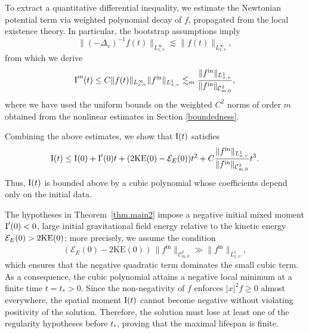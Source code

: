 \documentclass[reqno,11pt,final]{amsart}
\theoremstyle{plain}
\numberwithin{equation}{section}
\numberwithin{theorem}{section}
\begin{document}
To extract a quantitative differential inequality, we estimate the Newtonian
potential term via weighted polynomial decay of $f$, propagated from the local
existence theory. In particular, the bootstrap assumptions imply
$$
\|(-\Delta_v)^{-1} f(t)\|_{L^\infty_{x,v}} \lesssim \|f(t)\|_{L^\infty_{x,v}},
$$
from which we derive
$$
\textup{I}'''(t) \le C \|f(t)\|_{L^\infty_{x,v}} \|f^\textup{in}\|_{L^1_{x,v}}
\lesssim_m \frac{\|f^\textup{in}\|_{L^1_{x,v}}}{\|f^{\mathrm{in}}\|_{\mathcal{C}^2_{m,0}}},
$$
where we have used the uniform bounds on the weighted $C^2$ norms of order $m$ obtained from the
nonlinear estimates in Section \ref{boundedness}.

Combining the above estimates, we show that $\textup{I}(t)$ satisfies
$$
\textup{I}(t) \le \textup{I}(0) + \textup{I}'(0)t + (2\mathrm{KE}(0) - \mathcal{E}_E(0))t^2
+ C \frac{\|f^\textup{in}\|_{L^1_{x,v}}}{\|f^{\mathrm{in}}\|_{\mathcal{C}^2_{m,0}}}t^3.
$$
Thus, $\textup{I}(t)$ is bounded above by a cubic polynomial whose coefficients depend
only on the initial data.

The hypotheses in Theorem~\ref{thm.main2} impose a negative initial mixed moment
$\textup{I}'(0) < 0$, large initial gravitational field energy relative to the kinetic energy $\mathcal{E}_E(0)>2\textup{KE}(0)$; more precisely, we assume the condition
$$
(\mathcal{E}_E(0) - 2\mathrm{KE}(0))\,\|f^{\mathrm{in}}\|_{\mathcal{C}^2_{m,0}}
\gg \|f^{\mathrm{in}}\|_{L^1_{x,v}},
$$
which ensures that the negative quadratic term dominates the small cubic term. As a consequence, the cubic polynomial attains a negative local minimum
at a finite time $t=t_\ast>0$. Since the non-negativity of $f$ enforces
$|x|^2 f \ge 0$ almost everywhere, the spatial moment $\textup{I}(t)$ cannot become
negative without violating positivity of the solution. Therefore, the solution
must lose at least one of the regularity hypotheses before $t_\ast$, proving that the maximal
lifespan is finite.
\end{document}
